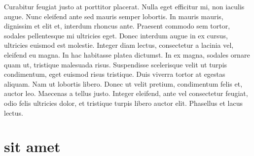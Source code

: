 	Curabitur feugiat justo at porttitor placerat. Nulla eget efficitur mi, non iaculis augue. Nunc eleifend ante sed mauris semper lobortis. In mauris mauris, dignissim et elit et, interdum rhoncus ante. Praesent commodo sem tortor, sodales pellentesque mi ultricies eget. Donec interdum augue in ex cursus, ultricies euismod est molestie. Integer diam lectus, consectetur a lacinia vel, eleifend eu magna. In hac habitasse platea dictumst. In ex magna, sodales ornare quam ut, tristique malesuada risus. Suspendisse scelerisque velit ut turpis condimentum, eget euismod risus tristique. Duis viverra tortor at egestas aliquam. Nam ut lobortis libero. Donec ut velit pretium, condimentum felis et, auctor leo. Maecenas a tellus justo. Integer eleifend, ante vel consectetur feugiat, odio felis ultricies dolor, et tristique turpis libero auctor elit. Phasellus et lacus lectus.   
	
	\section*{sit amet}
	
